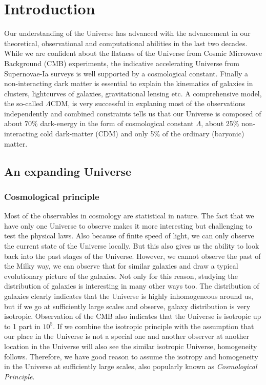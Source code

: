 \chapter{Introduction}\label{Introduction}

Our understanding of the Universe has advanced with the advancement in our 
theoretical, observational and computational abilities in the last two decades. 
While we are confident about the flatness of the Universe from Cosmic Microwave 
Background (CMB) experiments, 
the indicative accelerating Universe from Supernovae-Ia surveys is well supported
by a cosmological constant. Finally a non-interacting dark matter is essential 
to explain the kinematics of galaxies in clusters, lightcurves of galaxies, 
gravitational lensing etc. A comprehensive model, the so-called $\Lambda$CDM,
is very successful in explaning most of the observations independently and 
combined constraints tells us that our Universe is composed of about 70$\%$
dark-energy in the form of cosmological constant $\Lambda$, about 25$\%$ non-interacting
cold dark-matter (CDM) and only 5$\%$ of the ordinary (baryonic) matter.  


\section{An expanding Universe}

\subsection{Cosmological principle}

Most of the observables in cosmology are statistical in nature. 
The fact that we have only one Universe to observe
makes it more interesting but challenging to test the physical laws. Also because
of finite speed of light, we can only observe the current state of the Universe locally. 
But this also gives us the ability to look back into the past stages of the Universe. 
However, we cannot observe the past of the Milky way, we can observe that for similar
galaxies and draw a typical evolutionary picture of the galaxies. Not only for this
reason, studying the distribution of galaxies is interesting in many other ways too. 
The distribution of galaxies clearly indicates that the Universe is highly 
inhomogeneous around us, but if we go at sufficiently large scales and observe, 
galaxy distribution is very isotropic. Observation of the CMB also indicates 
that the Universe is isotropic up to 1 part in $10^{5}$. 
If we combine the isotropic principle with the 
assumption that our place in the Universe is not a special one and another observer
at another location in the Universe will also see the similar isotropic Universe,
homogeneity follows. Therefore, we have good reason to assume the isotropy 
and homogeneity in the Universe at sufficiently large scales, also popularly
known as {\it Cosmological Principle}.

